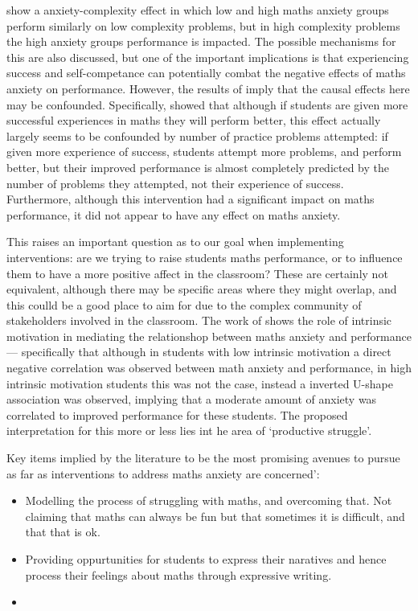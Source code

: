 \documentclass[14pt]{memoir}
\begin{document}
\cite{Faust1996} show a anxiety-complexity effect in which low and high maths anxiety groups perform similarly on low complexity problems, but in high complexity problems the high anxiety groups performance is impacted. The possible mechanisms for this are also discussed, but one of the important implications is that experiencing success and self-competance can potentially combat the negative effects of maths anxiety on performance. However, the results of \cite{Jansen2013} imply that the causal effects here may be confounded. Specifically, \cite{Jansen2013} showed that although if students are given more successful experiences in maths they will perform better, this effect actually largely seems to be confounded by number of practice problems attempted: if given more experience of success, students attempt more problems, and perform better, but their improved performance is almost completely predicted by the number of problems they attempted, not their experience of success. Furthermore, although this intervention had a significant impact on maths performance, it did not appear to have any effect on maths anxiety. 

This raises an important question as to our goal when implementing interventions: are we trying to raise students maths performance, or to influence them to have a more positive affect in the classroom? These are certainly not equivalent, although there may be specific areas where they might overlap, and this coulld be a good place to aim for due to the complex community of  stakeholders involved in the classroom. The work of \cite{Wang2015} shows the role of intrinsic motivation in mediating the relationshop between maths anxiety and performance --- specifically that although in students with low intrinsic motivation a direct negative correlation was observed between math anxiety and performance, in high intrinsic motivation students this was not the case, instead a inverted U-shape association was observed, implying that a moderate amount of anxiety was correlated to improved performance for these students. The proposed interpretation for this more or less lies int he area of `productive struggle'. 


Key items implied by the literature to be the most promising avenues to pursue as far as interventions to address maths anxiety are concerned':
\begin{itemize}
	\item Modelling the process of struggling with maths, and overcoming that. Not claiming that maths can always be fun but that sometimes it is difficult, and that that is ok.
	\item Providing oppurtunities for students to express their naratives and hence process their feelings about maths through expressive writing.
	\item 
\end{itemize}
\end{document}
